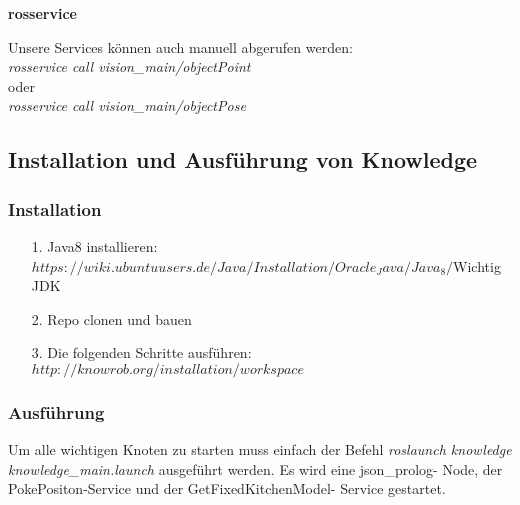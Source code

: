 \documentclass{suturo}
\begin{document}
\textbf{rosservice}

Unsere Services k\"onnen auch manuell abgerufen werden: \\

\textit{rosservice call vision\_main/objectPoint} \\

oder \\

\textit{rosservice call vision\_main/objectPose}

\subsection{Installation und Ausführung von Knowledge}

\subsubsection{Installation}

\begin{itemize}
\item[1.] Java8 installieren:$ https://wiki.ubuntuusers.de/Java/Installation/Oracle_Java/Java_8/ $Wichtig JDK
\item[2.] Repo clonen und bauen
\item[3.] Die folgenden Schritte ausführen: $http://knowrob.org/installation/workspace$
\end{itemize}

\subsubsection{Ausführung}

Um alle wichtigen Knoten zu starten muss einfach der Befehl \textit{roslaunch knowledge knowledge\_main.launch} ausgeführt werden. Es wird eine json\_prolog- Node, der PokePositon-Service und der GetFixedKitchenModel- Service gestartet.
\end{document}
